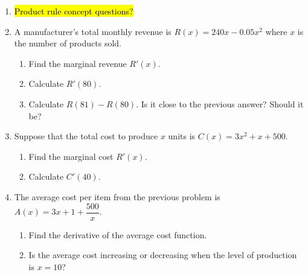 \documentclass[10pt]{article}
\begin{document}
\begin{enumerate}
\setcounter{enumi}{\theenumCount}
\item \hl{Product rule concept questions?}

\newpage
\item A manufacturer's total monthly revenue is $R(x) = 240 x - 0.05 x^2$ where $x$ is the number of products sold. 
\begin{enumerate}
\item Find the marginal revenue $R'(x)$. 
\vfill
\item Calculate $R'(80)$.  
\vfill

\item Calculate $R(81) - R(80)$.  Is it close to the previous answer?  Should it be? 
\vfill

\end{enumerate}


\item Suppose that the total cost to produce $x$ units is $C(x) = 3x^2 + x + 500$.  
\begin{enumerate}
\item Find the marginal cost $R'(x)$. 
\vfill

\item Calculate $C'(40)$.  
\vfill
\end{enumerate}

\item The average cost per item from the previous problem is $A(x) = 3x + 1 + \dfrac{500}{x}$.  
\begin{enumerate}
\item Find the derivative of the average cost function. 
\vfill

\item Is the average cost increasing or decreasing when the level of production is $x=10$?  
\vfill
\end{enumerate}

\end{enumerate}


\vfill

\end{document}
